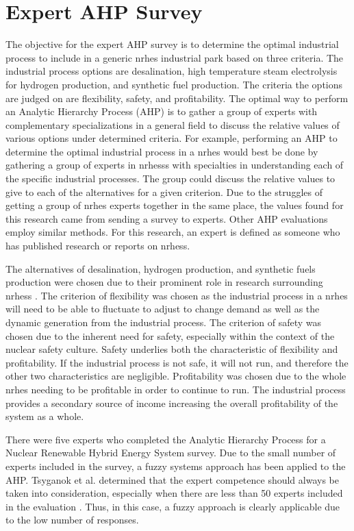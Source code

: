 \section{Expert AHP Survey}
The objective for the expert AHP survey is to determine the optimal industrial process to include in a generic \ac{nrhes} industrial park based on three criteria. The industrial process options are desalination, high temperature steam electrolysis for hydrogen production, and synthetic fuel production. The criteria the options are judged on are flexibility, safety, and profitability. The optimal way to perform an Analytic Hierarchy Process (AHP) is to gather a group of experts with complementary specializations in a general field to discuss the relative values of various options under determined criteria. For example, performing an AHP to determine the optimal industrial process in a \ac{nrhes} would best be done by gathering a group of experts in \ac{nrhess}s with specialties in understanding each of the specific industrial processes. The group could discuss the relative values to give to each of the alternatives for a given criterion. Due to the struggles of getting a group of \ac{nrhes} experts together in the same place, the values found for this research came from sending a survey to experts.  Other AHP evaluations employ similar methods\cite{Pan2008}. For this research, an expert is defined as someone who has published research or reports on \ac{nrhess}.

	The alternatives of desalination, hydrogen production, and synthetic fuels production were chosen due to their prominent role in research surrounding \ac{nrhess} \cite{Bragg-Sitton2014,Locatelli2015,Kim2016,Bragg-Sitton2016,Garcia2016,Shropshire2011, Ruth2014,Bienvenu2015}.  The criterion of flexibility was chosen as the industrial process in a \ac{nrhes} will need to be able to fluctuate to adjust to change demand as well as the dynamic generation from the industrial process.  The criterion of safety was chosen due to the inherent need for safety, especially within the context of the nuclear safety culture.  Safety underlies both the characteristic of flexibility and profitability. If the industrial process is not safe, it will not run, and therefore the other two characteristics are negligible. Profitability was chosen due to the whole \ac{nrhes} needing to be profitable in order to continue to run.  The industrial process provides a secondary source of income  increasing the overall profitability of the system as a whole.

There were five experts who completed the Analytic Hierarchy Process for a Nuclear Renewable Hybrid Energy System survey. Due to the small number of experts included in the survey, a fuzzy systems approach has been applied to the AHP. Tsyganok et al. determined that the expert competence should always be taken into consideration, especially when there are less than 50 experts included in the evaluation \cite{Tsyganok2012}. Thus, in this case, a fuzzy approach is clearly applicable due to the low number of responses.

